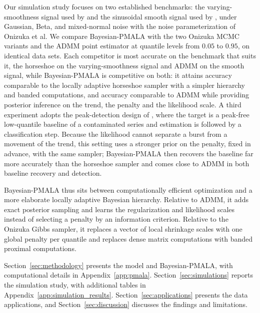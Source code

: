 Our simulation study focuses on two established benchmarks: the varying-smoothness signal used by \citet{onizuka2024fast} and the sinusoidal smooth signal used by \citet{brantley2020baseline}, under Gaussian, Beta, and mixed-normal noise with the noise parameterization of Onizuka et al. We compare Bayesian-PMALA with the two Onizuka MCMC variants and the ADMM point estimator at quantile levels from $0.05$ to $0.95$, on identical data sets. Each competitor is most accurate on the benchmark that suits it, the horseshoe on the varying-smoothness signal and ADMM on the smooth signal, while Bayesian-PMALA is competitive on both: it attains accuracy comparable to the locally adaptive horseshoe sampler with a simpler hierarchy and banded computations, and accuracy comparable to ADMM while providing posterior inference on the trend, the penalty and the likelihood scale. A third experiment adopts the peak-detection design of \citet{brantley2020baseline}, where the target is a peak-free low-quantile baseline of a contaminated series and estimation is followed by a classification step. Because the likelihood cannot separate a burst from a movement of the trend, this setting uses a stronger prior on the penalty, fixed in advance, with the same sampler; Bayesian-PMALA then recovers the baseline far more accurately than the horseshoe sampler and comes close to ADMM in both baseline recovery and detection.

Bayesian-PMALA thus sits between computationally efficient optimization and a more elaborate locally adaptive Bayesian hierarchy. Relative to ADMM, it adds exact posterior sampling and learns the regularization and likelihood scales instead of selecting a penalty by an information criterion. Relative to the Onizuka Gibbs sampler, it replaces a vector of local shrinkage scales with one global penalty per quantile and replaces dense matrix computations with banded proximal computations.

Section~\ref{sec:methodology} presents the model and Bayesian-PMALA, with computational details in Appendix~\ref{app:pmala}. Section~\ref{sec:simulations} reports the simulation study, with additional tables in Appendix~\ref{app:simulation_results}. Section~\ref{sec:applications} presents the data applications, and Section~\ref{sec:discussion} discusses the findings and limitations.
